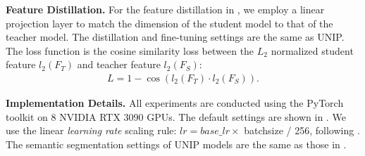 \textbf{Feature Distillation.} For the feature distillation in , we employ a linear projection layer to match the dimension of the student model to that of the teacher model. The distillation and fine-tuning settings are the same as UNIP. The loss function is the cosine similarity loss between the $L_2$ normalized student feature $l_2(F_T)$ and teacher feature $l_2(F_S)$: 
\begin{align}
    L=1-\cos(l_2(F_T)\cdot l_2(F_S)).
\end{align}

\textbf{Implementation Details.} All experiments are conducted using the PyTorch toolkit \citep{pytorch} on 8 NVIDIA RTX 3090 GPUs. The default settings are shown in . We use the linear \textit{learning rate} scaling rule: $lr=base\_lr \times$ batchsize / 256, following \citet{mae}. The semantic segmentation settings of UNIP models are the same as those in .





